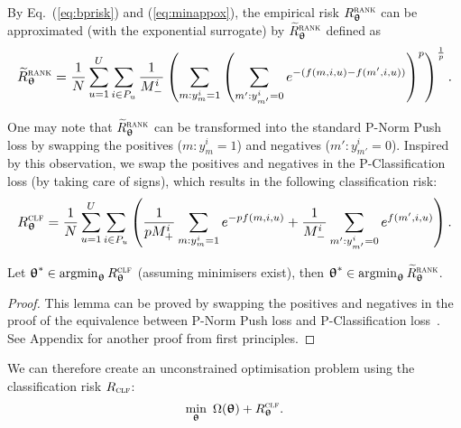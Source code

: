 By Eq.~(\ref{eq:bprisk}) and (\ref{eq:minappox}), the empirical risk $R_{{\bm{\uptheta}}}^{\textsc{rank}}$ can be 
approximated (with the exponential surrogate) by $\widetilde R_{{\bm{\uptheta}}}^{\textsc{rank}}$ defined as
\begin{equation*}
\resizebox{\linewidth}{!}{$
\begin{aligned}
\widetilde R_{\upthetabm}^{\textsc{rank}}
= \frac{1}{N} \sum_{u=1}^U \sum_{i \in P_u} \frac{1}{M_-^i} \left( \sum_{m: y_m^i = 1} \left( \sum_{m': y_{m'}^i = 0} 
  e^{-(f(m, i, u) - f(m', i, u))} \right)^p \right)^\frac{1}{p}.
\end{aligned}
$}
\end{equation*}


One may note that $\widetilde R_{{\bm{\uptheta}}}^{\textsc{rank}}$ can be transformed into the standard P-Norm Push loss by swapping the
positives ($m: y_m^i = 1$) and negatives ($m': y_{m'}^i = 0$). %
Inspired by this observation, we swap the positives and negatives in the P-Classification loss (by taking care of signs),
which results in the following classification risk:
\begin{equation*}
\resizebox{\linewidth}{!}{$\displaystyle
R_{\upthetabm}^{\textsc{clf}}
= \frac{1}{N} \sum_{u=1}^U \sum_{i \in P_u} \left(
  \frac{1}{p M_+^i} \sum_{m: y_m^i = 1} e^{-p f(m, i, u)}
  + \frac{1}{M_-^i} \sum_{m': y_{m'}^i = 0} e^{f(m', i, u)} \right).
$}
\end{equation*}

\begin{lemma}
\label{lm:rank2clf}
Let ${\bm{\uptheta}}^* \in \operatorname*{argmin}_{{\bm{\uptheta}}} R_{{\bm{\uptheta}}}^{\textsc{clf}}$ (assuming minimisers exist),
then ${\bm{\uptheta}}^* \in \operatorname*{argmin}_{{\bm{\uptheta}}} \widetilde R_{{\bm{\uptheta}}}^{\textsc{rank}}$.
\end{lemma}

\begin{proof}
This lemma can be proved by swapping the positives and negatives in the proof of 
the equivalence between P-Norm Push loss and P-Classification loss~\cite{ertekin2011equivalence}.
See Appendix for another proof from first principles.
\end{proof}

We can therefore create an unconstrained optimisation problem using the classification risk $R_\textsc{clf}$:
\begin{equation}
\label{eq:expobj_clf}
\min_{\bm{\uptheta}} \ \Omega({\bm{\uptheta}}) + R_{{\bm{\uptheta}}}^{\textsc{clf}}.
\end{equation}


